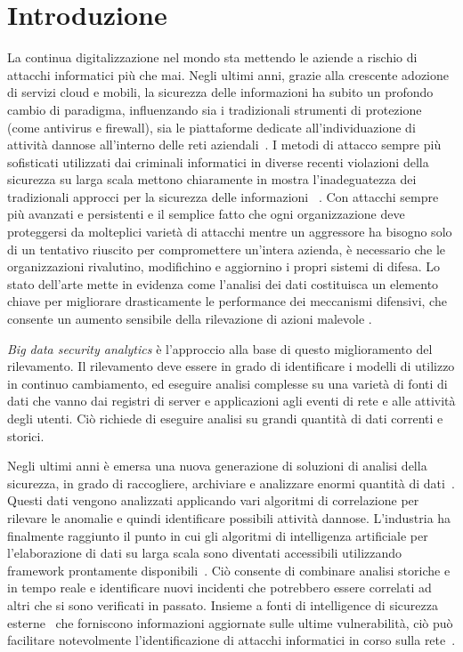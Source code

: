 \documentclass[../main.tex]{subfiles}
\begin{document}
\chapter{Introduzione}

La continua digitalizzazione nel mondo sta mettendo le aziende a rischio di attacchi informatici più che mai. Negli ultimi anni, grazie alla crescente adozione di servizi cloud e mobili, la sicurezza delle informazioni ha subito un profondo cambio di paradigma, influenzando sia i tradizionali strumenti di protezione (come antivirus e firewall), sia le piattaforme dedicate all'individuazione di attività dannose all'interno delle reti aziendali~\cite{Symantec:Report18}.
I metodi di attacco sempre più sofisticati utilizzati dai criminali informatici in diverse recenti violazioni della sicurezza su larga scala mettono chiaramente in mostra l'inadeguatezza dei tradizionali approcci per la sicurezza delle informazioni ~\cite{Ukrainian:Report, WikiLeaks:Vault7}.
Con attacchi sempre più avanzati e persistenti e il semplice fatto che ogni organizzazione deve proteggersi da molteplici varietà di attacchi mentre un aggressore ha bisogno solo di un tentativo riuscito per compromettere un'intera azienda, è necessario che le organizzazioni rivalutino, modifichino e aggiornino i propri sistemi di difesa. Lo stato dell'arte mette in evidenza come l'analisi dei dati costituisca un elemento chiave per migliorare drasticamente le performance dei meccanismi difensivi, che consente un aumento sensibile della rilevazione di azioni malevole \cite{bigdata}.

\textit{Big data security analytics} è l'approccio alla base di questo miglioramento del rilevamento. Il rilevamento deve essere in grado di identificare i modelli di utilizzo in continuo cambiamento, ed eseguire analisi complesse su una varietà di fonti di dati che vanno dai registri di server e applicazioni agli eventi di rete e alle attività degli utenti.
Ciò richiede di eseguire analisi su grandi quantità di dati correnti e storici.

Negli ultimi anni è emersa una nuova generazione di soluzioni di analisi della sicurezza, in grado di raccogliere, archiviare e analizzare enormi quantità di dati~\cite{IBM:Watson, Darktrace:ML}. Questi dati vengono analizzati applicando vari algoritmi di correlazione per rilevare le anomalie e quindi identificare possibili attività dannose.
L'industria ha finalmente raggiunto il punto in cui gli algoritmi di intelligenza artificiale per l'elaborazione di dati su larga scala sono diventati accessibili utilizzando framework prontamente disponibili~\cite{ApacheSpot:URL}.
Ciò consente di combinare analisi storiche e in tempo reale e identificare nuovi incidenti che potrebbero essere correlati ad altri che si sono verificati in passato. Insieme a fonti di intelligence di sicurezza esterne~\cite{Virustotal:URL} che forniscono informazioni aggiornate sulle ultime vulnerabilità, ciò può facilitare notevolmente l'identificazione di attacchi informatici in corso sulla rete~\cite{Apruzzese:Periodic}.
\end{document}
